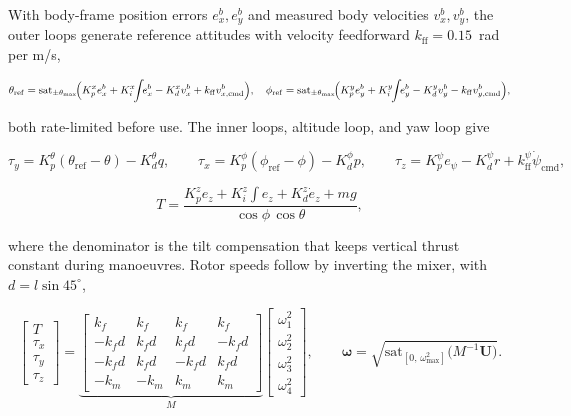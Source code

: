 \documentclass[10pt,letterpaper]{article}
\begin{document}
With body-frame position errors $e^b_x,e^b_y$ and measured body velocities
$v^b_x,v^b_y$, the outer loops generate reference attitudes with velocity feedforward
$k_{\mathrm{ff}}=0.15$~rad per m/s,

\begin{equation}
    \label{eq:e32}
    \theta_{\mathrm{ref}}=\mathrm{sat}_{\pm\theta_{\max}}\!\Bigl(
    K_p^{x}e^b_x+K_i^{x}\!\!\int\!\! e^b_x
    -K_d^{x}v^b_x+k_{\mathrm{ff}}v^b_{x,\mathrm{cmd}}\Bigr),
    \quad
    \phi_{\mathrm{ref}}=\mathrm{sat}_{\pm\theta_{\max}}\!\Bigl(
    K_p^{y}e^b_y+K_i^{y}\!\!\int\!\! e^b_y
    -K_d^{y}v^b_y-k_{\mathrm{ff}}v^b_{y,\mathrm{cmd}}\Bigr),
\end{equation}

both rate-limited before use. The inner loops, altitude loop, and yaw loop give

\begin{equation}
    \label{eq:e33}
    \tau_y=K_p^{\theta}(\theta_{\mathrm{ref}}-\theta)-K_d^{\theta}q,
    \qquad
    \tau_x=K_p^{\phi}(\phi_{\mathrm{ref}}-\phi)-K_d^{\phi}p,
    \qquad
    \tau_z=K_p^{\psi}e_\psi-K_d^{\psi}r+k_{\mathrm{ff}}^{\psi}\dot\psi_{\mathrm{cmd}},
\end{equation}

\begin{equation}
    \label{eq:e34}
    T=\frac{K_p^{z}e_z+K_i^{z}\!\!\int\!\! e_z+K_d^{z}\dot e_z+mg}{\cos\phi\,\cos\theta},
\end{equation}

where the denominator is the tilt compensation that keeps vertical thrust constant during
manoeuvres. Rotor speeds follow by inverting the mixer, with $d=l\sin 45^\circ$,

\begin{equation}
    \label{eq:e35}
    \begin{bmatrix}T\\\tau_x\\\tau_y\\\tau_z\end{bmatrix}
    =\underbrace{\begin{bmatrix}
            k_f   & k_f  & k_f   & k_f   \\
            -k_fd & k_fd & k_fd  & -k_fd \\
            -k_fd & k_fd & -k_fd & k_fd  \\
            -k_m  & -k_m & k_m   & k_m
        \end{bmatrix}}_{M}
    \begin{bmatrix}\omega_1^2\\\omega_2^2\\\omega_3^2\\\omega_4^2\end{bmatrix},
    \qquad
    \boldsymbol{\omega}=\sqrt{\mathrm{sat}_{[0,\,\omega_{\max}^2]}\bigl(M^{-1}\mathbf{U}\bigr)} .
\end{equation}
\end{document}
